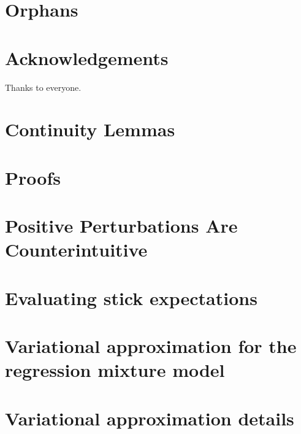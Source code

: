 \documentclass[11pt]{article}
\begin{document}
\section{Orphans}




\section{Acknowledgements}
Thanks to everyone.






\clearpage
\newpage

\appendix
\section*{Continuity Lemmas}


\section*{Proofs}


\section*{Positive Perturbations Are Counterintuitive}


\section*{Evaluating stick expectations}

\section*{Variational approximation for the regression mixture model}


\section{Variational approximation details}
\end{document}
